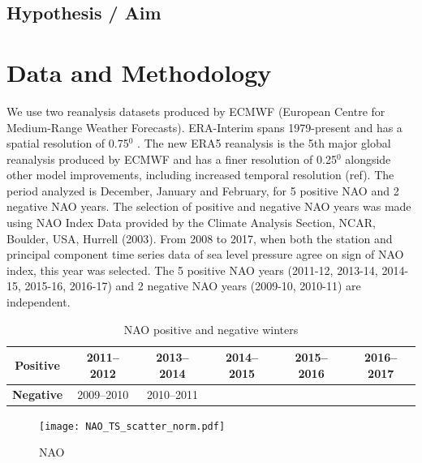 \subsection{ Hypothesis / Aim}



\section{Data and Methodology}

We use two reanalysis datasets produced by ECMWF (European Centre for Medium-Range Weather Forecasts). ERA-Interim spans 1979-present and has a spatial resolution of 0.75$^{0}$ \citep{dee2011era}. The new ERA5 reanalysis is the 5th major global reanalysis produced by ECMWF and has a finer resolution of 0.25$^{0}$ alongside other model improvements, including increased temporal resolution (ref). The period analyzed is December, January and February, for 5 positive NAO and 2 negative NAO years. The selection of positive and negative NAO years was made using NAO Index Data provided by the Climate Analysis Section, NCAR, Boulder, USA, Hurrell (2003). From 2008 to 2017, when both the station and principal component time series data of sea level pressure agree on sign of NAO index, this year was selected. The 5 positive NAO years (2011-12, 2013-14, 2014-15, 2015-16, 2016-17) and 2 negative NAO years (2009-10, 2010-11) are independent.

  \begin{table}
  \caption{NAO positive and negative winters} \label{t_NAO}
  \centering
  \begin{tabular}{c c c c c c}
  \hline
  \textbf{Positive} & 2011--2012 & 2013--2014 & 2014--2015 & 2015--2016 & 2016--2017 \\
  \hline
  \textbf{Negative}  & 2009--2010  & 2010--2011 &  &  &  \\
  \hline
  \end{tabular}
  \end{table}



 \begin{figure}[h]
 	\centering
 	\texttt{[image: NAO\_TS\_scatter\_norm.pdf]}
 	\caption{NAO}
 	\label{fig:NAO_TS}
 \end{figure}

